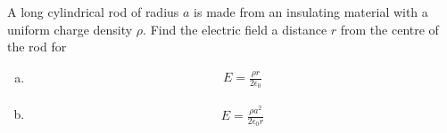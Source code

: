 \question A long cylindrical rod of radius $a$ is made from an insulating material with a uniform charge density $\rho$. Find the electric field a distance $r$ from the centre of the rod for
\begin{finalanswer}
\begin{enumerate}[(a)]
\item \begin{align*}
E=\frac{\rho r}{2\epsilon_0}
\end{align*}
\item \begin{align*}
E=\frac{\rho a^2}{2\epsilon_0r}
\end{align*}
\end{enumerate}
\end{finalanswer}
